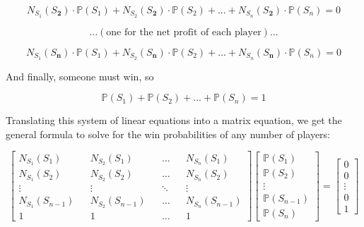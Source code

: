 \documentclass[english,12pt,a4paper,final]{article}
\begin{document}
\begin{equation*}
	N_{S_1}(S_\textbf{2}) \cdot \mathbb{P}(S_1) + N_{S_2}(S_\textbf{2}) \cdot \mathbb{P}(S_2) + ... + N_{S_n}(S_\textbf{2}) \cdot \mathbb{P}(S_n) = 0
\end{equation*}

\begin{equation*}
	...(\text{one for the net profit of each player})...
\end{equation*}

\begin{equation*}
	N_{S_1}(S_\textbf{n}) \cdot \mathbb{P}(S_1) + N_{S_2}(S_\textbf{n}) \cdot \mathbb{P}(S_2) + ... + N_{S_n}(S_\textbf{n}) \cdot \mathbb{P}(S_n) = 0
\end{equation*}

And finally, someone must win, so 

\begin{equation*}
	\mathbb{P}(S_1) + \mathbb{P}(S_2) + ... + \mathbb{P}(S_n) = 1
\end{equation*}

Translating this system of linear equations into a matrix equation, we get the general formula to solve for the win probabilities of any number of players:

\begin{equation}\label{generalFormula}
	\begin{bmatrix}
		N_{S_1}(S_1) && N_{S_2}(S_1) && \dots && N_{S_n}(S_1) \\
		N_{S_1}(S_2) && N_{S_2}(S_2) && \dots && N_{S_n}(S_2) \\
		\vdots && \vdots && \ddots && \vdots \\
		N_{S_1}(S_{n-1}) && N_{S_2}(S_{n-1}) && \dots && N_{S_n}(S_{n-1}) \\
		1 && 1 && \dots && 1
	\end{bmatrix}
	\begin{bmatrix}
		\mathbb{P}(S_1) \\ \mathbb{P}(S_2) \\ \vdots \\ \mathbb{P}(S_{n-1}) \\  \mathbb{P}(S_n)
	\end{bmatrix}
	=
	\begin{bmatrix}
		0 \\ 0 \\ \vdots \\ 0 \\ 1
	\end{bmatrix}
\end{equation}
\end{document}
